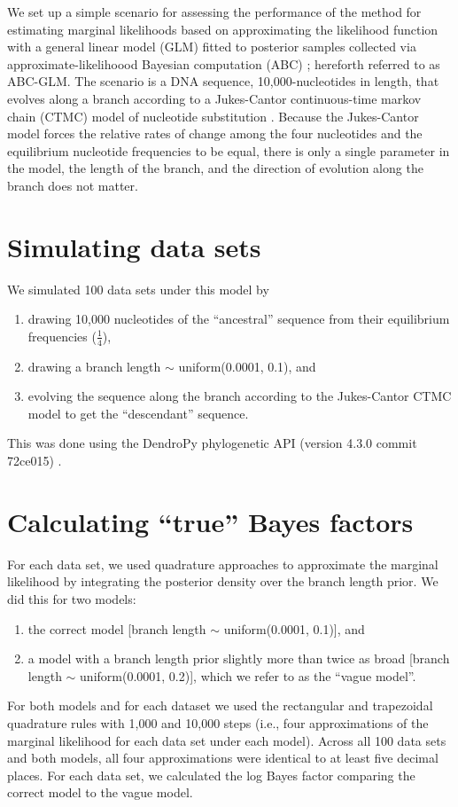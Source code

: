 We set up a simple scenario for assessing the performance of the method for
estimating marginal likelihoods based on approximating the likelihood function
with a general linear model (GLM) fitted to posterior samples collected via
approximate-likelihoood Bayesian computation (ABC) \citep{Leuenberger2010};
hereforth referred to as ABC-GLM.
The scenario is a DNA sequence, 10,000-nucleotides in length, that evolves
along a branch according to a Jukes-Cantor continuous-time markov chain (CTMC)
model of nucleotide substitution \citep{JC1969}.
Because the Jukes-Cantor model forces the relative rates of change among the
four nucleotides and the equilibrium nucleotide frequencies to be equal, there
is only a single parameter in the model, the length of the branch, and the
direction of evolution along the branch does not matter.

\section{Simulating data sets}
We simulated 100 data sets under this model by
\begin{enumerate}
    \item drawing 10,000 nucleotides of the ``ancestral'' sequence from their
        equilibrium frequencies ($\frac{1}{4}$), 
    \item drawing a branch length $\sim$ uniform(0.0001, 0.1), and
    \item evolving the sequence along the branch according to the Jukes-Cantor
        CTMC model to get the ``descendant'' sequence.
\end{enumerate}
This was done using the DendroPy phylogenetic API (version 4.3.0 commit
72ce015) \citep{Sukumaran2010}.

\section{Calculating ``true'' Bayes factors}
For each data set, we used quadrature approaches to approximate the marginal
likelihood by integrating the posterior density over the branch length prior.
We did this for two models:
\begin{enumerate}
    \item the correct model [branch length $\sim$ uniform(0.0001, 0.1)], and
    \item a model with a branch length prior slightly more than twice as broad
        [branch length $\sim$ uniform(0.0001, 0.2)], which we refer to as the
        ``vague model''.
\end{enumerate}
For both models and for each dataset we used the rectangular and trapezoidal
quadrature rules with 1,000 and 10,000 steps (i.e., four approximations of the
marginal likelihood for each data set under each model).
Across all 100 data sets and both models, all four approximations were
identical to at least five decimal places.
For each data set, we calculated the log Bayes factor comparing the correct
model to the vague model.

